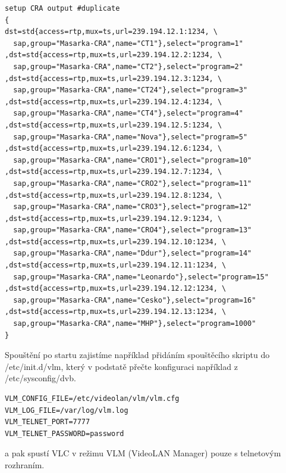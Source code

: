 \begin{small}
\begin{verbatim}
setup CRA output #duplicate
{
dst=std{access=rtp,mux=ts,url=239.194.12.1:1234, \
  sap,group="Masarka-CRA",name="CT1"},select="program=1"
,dst=std{access=rtp,mux=ts,url=239.194.12.2:1234, \
  sap,group="Masarka-CRA",name="CT2"},select="program=2"
,dst=std{access=rtp,mux=ts,url=239.194.12.3:1234, \ 
  sap,group="Masarka-CRA",name="CT24"},select="program=3"
,dst=std{access=rtp,mux=ts,url=239.194.12.4:1234, \
  sap,group="Masarka-CRA",name="CT4"},select="program=4"
,dst=std{access=rtp,mux=ts,url=239.194.12.5:1234, \
  sap,group="Masarka-CRA",name="Nova"},select="program=5"
,dst=std{access=rtp,mux=ts,url=239.194.12.6:1234, \
  sap,group="Masarka-CRA",name="CRO1"},select="program=10"
,dst=std{access=rtp,mux=ts,url=239.194.12.7:1234, \
  sap,group="Masarka-CRA",name="CRO2"},select="program=11"
,dst=std{access=rtp,mux=ts,url=239.194.12.8:1234, \
  sap,group="Masarka-CRA",name="CRO3"},select="program=12"
,dst=std{access=rtp,mux=ts,url=239.194.12.9:1234, \
  sap,group="Masarka-CRA",name="CRO4"},select="program=13"
,dst=std{access=rtp,mux=ts,url=239.194.12.10:1234, \
  sap,group="Masarka-CRA",name="Ddur"},select="program=14"
,dst=std{access=rtp,mux=ts,url=239.194.12.11:1234, \
  sap,group="Masarka-CRA",name="Leonardo"},select="program=15"
,dst=std{access=rtp,mux=ts,url=239.194.12.12:1234, \
  sap,group="Masarka-CRA",name="Cesko"},select="program=16"
,dst=std{access=rtp,mux=ts,url=239.194.12.13:1234, \
  sap,group="Masarka-CRA",name="MHP"},select="program=1000"
}
\end{verbatim}
\end{small}

\vspace{10pt}

Spouštění po startu zajistíme například přidáním spouštěcího skriptu do /etc/init.d/vlm, který v podstatě přečte konfiguraci například z /etc/sysconfig/dvb.

\vspace{10pt}

\begin{small}
\begin{verbatim}
VLM_CONFIG_FILE=/etc/videolan/vlm/vlm.cfg
VLM_LOG_FILE=/var/log/vlm.log
VLM_TELNET_PORT=7777
VLM_TELNET_PASSWORD=password
\end{verbatim}
\end{small}

\vspace{10pt}

a pak spustí VLC v režimu VLM (VideoLAN Manager) pouze s telnetovým rozhraním.

